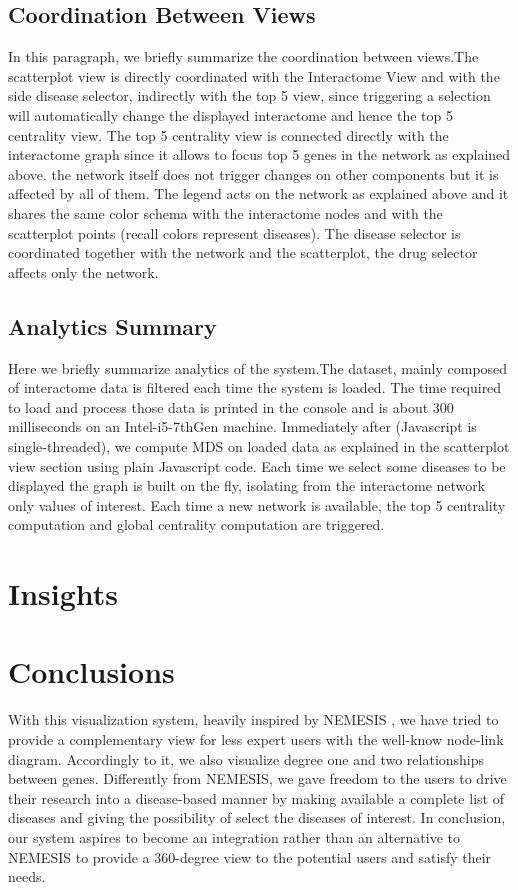 \documentclass[12pt,twocolumn,twoside]{article}
\begin{document}
	\subsection*{Coordination Between Views}
	In this paragraph, we briefly summarize the coordination between views.\newline The scatterplot view is directly coordinated with the Interactome View and with the side disease selector, indirectly with the top 5 view, since triggering a selection will automatically change the displayed interactome and hence the top 5 centrality view.
	The top 5 centrality view is connected directly with the interactome graph since it allows to focus top 5 genes in the network as explained above. the network itself does not trigger changes on other components but it is affected by all of them. The legend acts on the network as explained above and it shares the same color schema with the interactome nodes and with the scatterplot points (recall colors represent diseases). The disease selector is coordinated together with the network and the scatterplot, the drug selector affects only the network.
	
	
	\subsection*{Analytics Summary}
	Here we briefly summarize analytics of the system.\newline The dataset, mainly composed of interactome data is filtered each time the system is loaded. The time required to load and process those data is printed in the console and is about 300 milliseconds on an Intel-i5-7thGen machine. Immediately after (Javascript is single-threaded), we compute MDS on loaded data as explained in the scatterplot view section using plain Javascript code. Each time we select some diseases to be displayed the graph is built on the fly, isolating from the interactome network only values of interest. Each time a new network is available, the top 5 centrality computation and global centrality computation are triggered.
	
	\section*{Insights}
	
	
	\section*{Conclusions}
	With this visualization system, heavily inspired by NEMESIS \cite{ivapp19}, we have tried to provide a complementary view for less expert users with the well-know node-link diagram. Accordingly to it, we also visualize degree one and two relationships between genes. Differently from NEMESIS, we gave freedom to the users to drive their research into a disease-based manner by making available a complete list of diseases and giving the possibility of select the diseases of interest. In conclusion, our system aspires to become an integration rather than an alternative to NEMESIS to provide a 360-degree view to the potential users and satisfy their needs.
	\clearpage
	
	 
	
\end{document}
